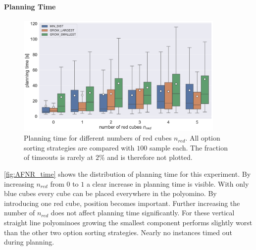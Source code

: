 \paragraph{Planning Time}

\begin{figure}
	\centering
	\includegraphics[width=0.9\textwidth]{figures/plots/AFNR_time.pdf}
	\caption[Planning time for number of red cubes]{Planning time for different numbers of red cubes $n_\textit{red}$. All option sorting strategies are compared with $100$ sample each. The fraction of timeouts is rarely at $2\%$ and is therefore not plotted.}
	\label{fig:AFNR_time}
\end{figure}


\autoref{fig:AFNR_time} shows the distribution of planning time for this experiment.
By increasing $n_\textit{red}$ from $0$ to $1$ a clear increase in planning time is visible.
With only blue cubes every cube can be placed everywhere in the polyomino.
By introducing one red cube, position becomes important.
Further increasing the number of $n_\textit{red}$ does not affect planning time significantly.
For these vertical straight line polyominoes growing the smallest component performs slightly worst than the other two option sorting strategies.
Nearly no instances timed out during planning. 



